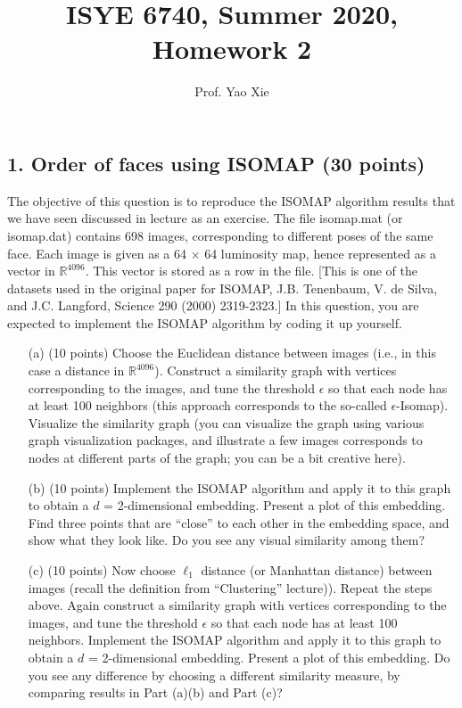 \documentclass[twoside,12pt]{article}
\begin{document}
\title{ISYE 6740, Summer 2020, Homework 2}
\author{Prof. Yao Xie}
\date{}
\maketitle



\subsection*{1. Order of faces using ISOMAP (30 points)}

The objective of this question is to reproduce the ISOMAP algorithm results that we have seen discussed in lecture as an exercise. The file \textsf{isomap.mat} (or \textsf{isomap.dat}) contains 698 images, corresponding to different poses of the same face. Each image is given as a 64 $\times$ 64 luminosity map, hence represented as a vector in $\mathbb R^{4096}$. This vector is stored as a row in the file. [This is one of the datasets used in the original paper for ISOMAP, J.B. Tenenbaum, V. de Silva, and J.C. Langford, Science 290 (2000) 2319-2323.] In this question, you are expected to implement the ISOMAP algorithm by coding it up yourself.

\begin{enumerate} 
\item[(a)] (10 points) Choose the Euclidean distance between images (i.e., in this case a distance in $\mathbb R^{4096}$). Construct a similarity graph with vertices corresponding to the images, and tune the threshold $\epsilon$ so that each node has at least 100 neighbors (this approach corresponds to the so-called $\epsilon$-Isomap). Visualize the similarity graph (you can visualize the graph  using various graph visualization packages, and illustrate a few images corresponds to nodes at different parts of the graph; you can be a bit creative here).
 
\item[(b)] (10 points) Implement the ISOMAP algorithm and apply it to this graph to obtain a $d$ = 2-dimensional embedding. Present a plot of this embedding. Find three points that are ``close'' to each other in the embedding space, and show what they look like. Do you see any visual similarity among them?

\item[(c)] (10 points) Now choose $\ell_1$ distance (or Manhattan distance) between images (recall the definition from ``Clustering'' lecture)). Repeat the steps above. Again construct a similarity graph with vertices corresponding to the images, and tune the threshold $\epsilon$ so that each node has at least 100 neighbors. Implement the ISOMAP algorithm and apply it to this graph to obtain a $d$ = 2-dimensional embedding. Present a plot of this embedding.  Do you see any difference by choosing a different similarity measure, by comparing results in Part (a)(b) and Part (c)? 

\end{enumerate}
\end{document}
